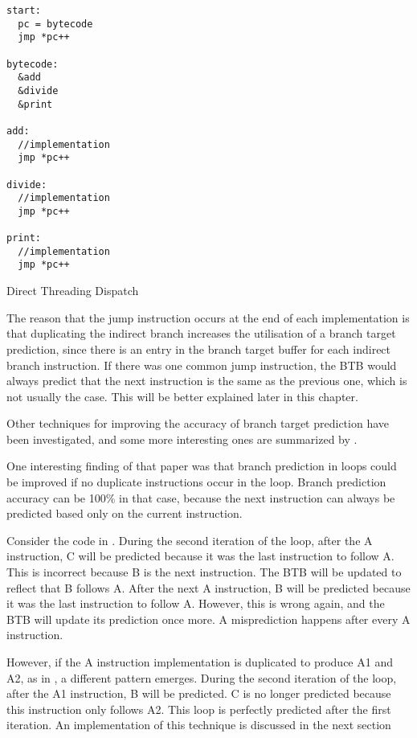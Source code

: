 		\begin{myfigure}
				\begin{lstlisting}
start:
  pc = bytecode
  jmp *pc++

bytecode:
  &add
  &divide
  &print

add:
  //implementation
  jmp *pc++

divide:
  //implementation
  jmp *pc++

print:
  //implementation
  jmp *pc++

				\end{lstlisting}
				\caption{Direct Threading Dispatch}
				\label{fig:directthreading}
		\end{myfigure}
		
		The reason that the jump instruction occurs at the end of each implementation is that duplicating the indirect branch increases the utilisation of a branch target prediction, since there is an entry in the branch target buffer for each indirect branch instruction. If there was one common jump instruction, the BTB would always predict that the next instruction is the same as the previous one, which is not usually the case. This will be better explained later in this chapter.
		
		Other techniques for improving the accuracy of branch target prediction have been investigated, and some more interesting ones are summarized by \cite{optimizingindirectbranch}. 
		
		One interesting finding of that paper was that branch prediction in loops could be improved if no duplicate instructions occur in the loop. Branch prediction accuracy can be 100\% in that case, because the next instruction can always be predicted based only on the current instruction. 
		
		Consider the code in . During the second iteration of the loop, after the A instruction, C will be predicted because it was the last instruction to follow A. This is incorrect because B is the next instruction. The BTB will be updated to reflect that B follows A. After the next A instruction, B will be predicted because it was the last instruction to follow A. However, this is wrong again, and the BTB will update its prediction once more. A misprediction happens after every A instruction.
		
		However, if the A instruction implementation is duplicated to produce A1 and A2, as in , a different pattern emerges. During the second iteration of the loop, after the A1 instruction, B will be predicted. C is no longer predicted because this instruction only follows A2. This loop is perfectly predicted after the first iteration. An implementation of this technique is discussed in the next section
		
